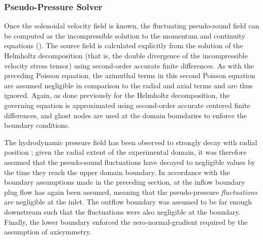 \subsubsection{Pseudo-Pressure Solver}
Once the solenoidal velocity field is known, the fluctuating pseudo-sound field can be computed as the incompressible solution to the momentum and continuity equations ().
The source field is calculated explicitly from the solution of the Helmholtz decomposition (that is, the double divergence of the incompressible velocity stress tensor) using second-order accurate finite differences.
As with the preceding Poisson equation, the azimuthal terms in this second Poisson equation are assumed negligible in comparison to the radial and axial terms and are thus ignored.
Again, as done previously for the Helmholtz decomposition, the governing equation is approximated using second-order accurate centered finite differences, and ghost nodes are used at the domain boundaries to enforce the boundary conditions.

The hydrodynamic pressure field has been observed to strongly decay with radial position \citep{Arndt1997}; given the radial extent of the experimental domain, it was therefore assumed that the pseudo-sound fluctuations have decayed to negligible values by the time they reach the upper domain boundary.
In accordance with the boundary assumptions made in the preceding section, at the inflow boundary plug flow has again been assumed, meaning that the pseudo-pressure \textit{fluctuations} are negligible at the inlet. 
The outflow boundary was assumed to be far enough downstream such that the fluctuations were also negligible at the boundary.
Finally, the lower boundary enforced the zero-normal-gradient required by the assumption of axisymmetry.

